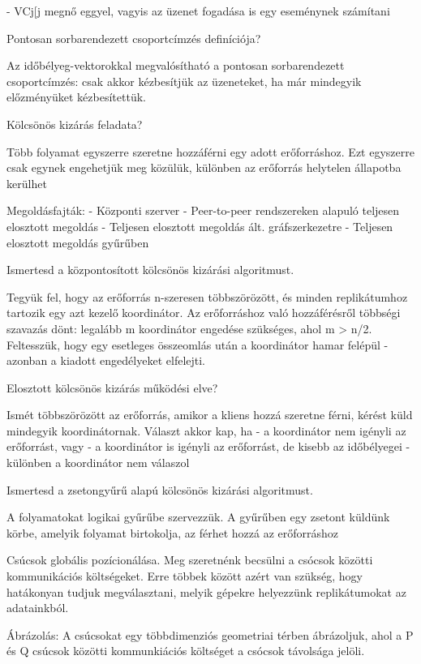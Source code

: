 \documentclass[12pt]{article}
\begin{document}
\begin{description}[style=unboxed]
        - VCj[j megnő eggyel, vagyis az üzenet fogadása is egy eseménynek számítani
    \item  Pontosan sorbarendezett csoportcímzés definíciója?
    \item Az időbélyeg-vektorokkal megvalósítható a pontosan sorbarendezett csoportcímzés: csak akkor kézbesítjük az üzeneteket,
        ha már mindegyik előzményüket kézbesítettük.
    \item  Kölcsönös kizárás feladata?
    \item Több folyamat egyszerre szeretne hozzáférni egy adott erőforráshoz. Ezt egyszerre csak egynek engehetjük meg közülük,
        különben az erőforrás helytelen állapotba kerülhet
    \item Megoldásfajták: 
        - Központi szerver
        - Peer-to-peer rendszereken alapuló teljesen elosztott megoldás
        - Teljesen elosztott megoldás ált. gráfszerkezetre
        - Teljesen elosztott megoldás gyűrűben
    \item  Ismertesd a központosított kölcsönös kizárási algoritmust.
    \item Tegyük fel, hogy az erőforrás n-szeresen többszörözött, és minden replikátumhoz tartozik egy azt kezelő koordinátor.
        Az erőforráshoz való hozzáférésről többségi szavazás dönt: legalább m koordinátor engedése szükséges, ahol m > n/2.
        Feltesszük, hogy egy esetleges összeomlás után a koordinátor hamar felépül - azonban a kiadott engedélyeket elfelejti.
    \item  Elosztott kölcsönös kizárás működési elve?
    \item Ismét többszörözött az erőforrás, amikor a kliens hozzá szeretne férni, kérést küld mindegyik koordinátornak. Választ akkor kap, ha
        - a koordinátor nem igényli az erőforrást, vagy
        - a koordinátor is igényli az erőforrást, de kisebb az időbélyegei
        - különben a koordinátor nem válaszol
    \item  Ismertesd a zsetongyűrű alapú kölcsönös kizárási algoritmust.
    \item A folyamatokat logikai gyűrűbe szervezzük. A gyűrűben egy zsetont küldünk körbe, amelyik folyamat birtokolja,
        az férhet hozzá az erőforráshoz
    \item  Csúcsok globális pozícionálása. Meg szeretnénk becsülni a csócsok közötti kommunikációs költségeket. Erre többek között azért van szükség, hogy hatákonyan
        tudjuk megválasztani, melyik gépekre helyezzünk replikátumokat az adatainkból.
    \item Ábrázolás: A csúcsokat egy többdimenziós geometriai térben ábrázoljuk, ahol a P és Q csúcsok közötti kommunkiációs költséget a csócsok távolsága jelöli.

\end{description}
\end{document}
